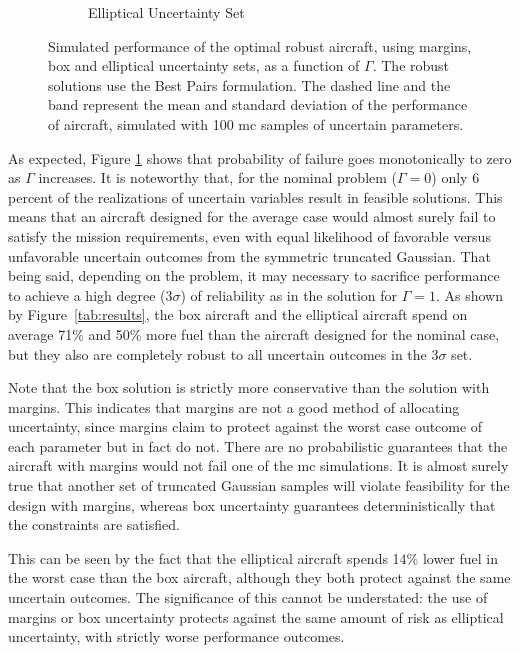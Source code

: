 \begin{figure}[ht]
\begin{subfigure}{0.49\textwidth}
         \caption{Elliptical Uncertainty Set}
    \end{subfigure}
    \caption{Simulated performance of the optimal robust aircraft, using margins, box and elliptical uncertainty sets,
    as a function of $\Gamma$. The robust solutions use the Best Pairs formulation.
    The dashed line and the band represent the mean and standard deviation of the performance
    of aircraft, simulated with 100 \gls{mc} samples of uncertain parameters.}
    \label{fig:probOfFailure}
\end{figure}


As expected, Figure \ref{fig:probOfFailure} shows that probability of failure goes monotonically
to zero as $\Gamma$ increases.
It is noteworthy that, for the nominal problem ($\Gamma = 0$) only 6 percent of the realizations of
uncertain variables result in feasible solutions.
This means that an aircraft designed for the average case would almost surely
fail to satisfy the mission requirements, even with equal likelihood of favorable versus
unfavorable uncertain outcomes from the symmetric truncated Gaussian.
That being said, depending on the problem, it may necessary to sacrifice
performance to achieve a high degree ($3\sigma$) of
reliability as in the solution for $\Gamma = 1$. As shown by Figure~\ref{tab:results}, the box aircraft
and the elliptical aircraft spend on average 71\% and 50\% more fuel
than the aircraft designed for the nominal case, but they also are
completely robust to all uncertain outcomes in the $3\sigma$ set.

Note that the box solution is strictly more conservative than the solution with margins.
This indicates that margins are not a good method of allocating uncertainty,
since margins claim to protect against the worst case outcome of each parameter but in
fact do not. There are no probabilistic guarantees that the aircraft
with margins would not fail one of the \gls{mc} simulations. It is almost surely true
that another set of truncated Gaussian samples will violate feasibility for the design with margins,
whereas box uncertainty guarantees deterministically that the constraints are satisfied.

This can be seen by the fact that
the elliptical aircraft spends 14\% lower fuel in the worst case
than the box aircraft, although they both protect against the same uncertain outcomes.
The significance of this cannot be understated: the use of margins or box uncertainty protects
against the same amount of risk as elliptical uncertainty, with strictly worse performance outcomes.

